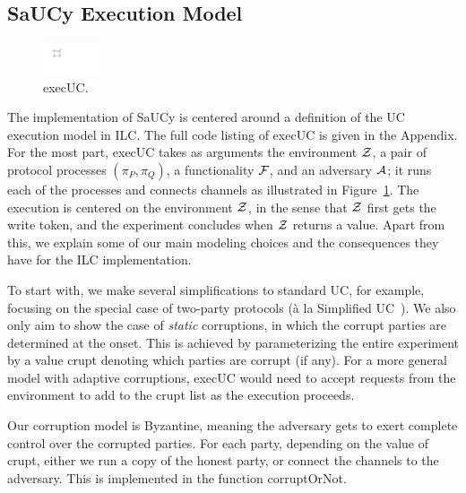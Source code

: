 \subsection{SaUCy Execution Model}
\label{subsec:concrete-uc}
\begingroup
\setlength\intextsep{0pt}
\setlength{\columnsep}{10pt}
\begin{figure}
\centering
\includegraphics[width=0.15\textwidth]{graphics/execUC}
\caption{\textsf{execUC}.}
\label{fig:execUC-diagram}
\end{figure}
The implementation of SaUCy is centered around a definition of the UC execution
model in ILC.  The full code listing of \textsf{execUC} is given in the
Appendix.  For the most part, \textsf{execUC} takes as arguments the environment
$\mathcal{{Z}}$, a pair of protocol processes $(\pi_P,\pi_Q)$, a functionality $\mathcal{{F}}$,
and an adversary $\mathcal{{A}}$; it runs each of the processes and connects channels
as illustrated in Figure~\ref{fig:execUC-diagram}.  The execution is centered on
the environment $\mathcal{{Z}}$, in the sense that $\mathcal{{Z}}$ first gets the write token,
and the experiment concludes when $\mathcal{{Z}}$ returns a value.  Apart from this, we
explain some of our main modeling choices and the consequences they have for the
ILC implementation.

To start with, we make several simplifications to standard UC, for example,
focusing on the special case of two-party protocols (\`{a} la Simplified
UC~\cite{canetti2015simpler}).  We also only aim to show the case of
\emph{static} corruptions, in which the corrupt parties are determined at the
onset.  This is achieved by parameterizing the entire experiment by a value
\textsf{crupt} denoting which parties are corrupt (if any).  For a more general
model with adaptive corruptions, \textsf{execUC} would need to accept requests
from the environment to add to the \textsf{crupt} list as the execution
proceeds.

Our corruption model is Byzantine, meaning the adversary gets to exert complete
control over the corrupted parties.
For each party, depending on the value of \textsf{crupt}, either we run a copy
of the honest party, or connect the channels to the adversary. This is
implemented in the function \textsf{corruptOrNot}.

